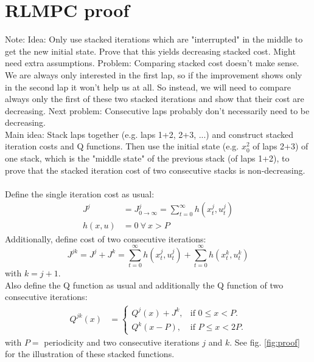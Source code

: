 \documentclass[10pt,a4paper]{article}
\begin{document}
\section{RLMPC proof}
Note: Idea: Only use stacked iterations which are "interrupted" in the middle to get the new initial state. Prove that this yields decreasing stacked cost. Might need extra assumptions. Problem: Comparing stacked cost doesn't make sense. We are always only interested in the first lap, so if the improvement shows only in the second lap it won't help us at all. So instead, we will need to compare always only the first of these two stacked iterations and show that their cost are decreasing. Next problem: Consecutive laps probably don't necessarily need to be decreasing. \\
Main idea: Stack laps together (e.g. laps 1+2, 2+3, ...) and construct stacked iteration costs and Q functions. Then use the initial state (e.g. $x_0^2$ of laps 2+3) of one stack, which is the "middle state" of the previous stack (of laps 1+2), to prove that the stacked iteration cost of two consecutive stacks is non-decreasing.\\\\
Define the single iteration cost as usual:
\begin{align}
J^j&=J^j_{0\rightarrow\infty}=\sum_{t=0}^\infty h(x_t^j,u_t^j)\\
h(x,u)&=0\ \forall\ x>P
\end{align}
Additionally, define cost of two consecutive iterations:
\begin{equation}
J^{jk}=J^j+J^{k}=\sum_{t=0}^\infty h(x_t^j,u_t^j)+\sum_{t=0}^\infty h(x_t^{k},u_t^{k})
\end{equation}
with $k = j+1$.\\
Also define the Q function as usual and additionally the Q function of two consecutive iterations:
\begin{align}
Q^{jk}(x)&=\begin{cases}
Q^j(x)+J^k, & \text{if $0\leq x<P$}.\\
Q^k(x-P), & \text{if $P\leq x<2P$}.
\end{cases}
\end{align}
with $P=$ periodicity and two consecutive iterations $j$ and $k$. See fig. \ref{fig:proof} for the illustration of these stacked functions.\\
\end{document}

